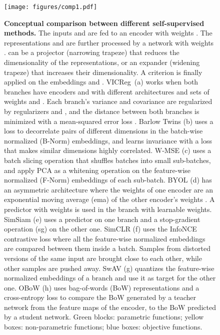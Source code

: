 \documentclass{article}
\newcommand{\algo}{VICReg}
\begin{document}
\newpage

\begin{figure}[t]
\centering
\hspace{2mm}
{\texttt{[image: figures/comp1.pdf]}}
\vspace{-10mm}
\end{figure}

\begin{figure}[t]
\centering
\captionsetup[subfigure]{labelformat=empty}
\vspace{-4mm}
\caption{\textbf{Conceptual comparison between different self-supervised methods.} The inputs  and  are fed to an encoder  with weights . The representations  and  are further processed by a network  with weights .  can be a projector (narrowing trapeze) that reduces the dimensionality of the representations, or an expander (widening trapeze) that increases their dimensionality. A criterion is finally applied on the embeddings  and . \algo \ (a) works when both branches have encoders  and  with different architectures and sets of weights  and . Each branch's variance and covariance are regularized by regularizers  and , and the distance between both branches is minimized with a mean-squared error loss . Barlow Twins (b) uses a loss  to decorrelate pairs of different dimensions in the batch-wise normalized (B-Norm) embeddings, and learns invariance with a loss  that makes similar dimensions highly correlated. W-MSE (c) uses a batch slicing operation that shuffles batches into small sub-batches, and apply PCA as a whitening operation on the feature-wise normalized (F-Norm) embeddings of each sub-batch. BYOL (d) has an asymmetric architecture where the weights  of one encoder are an exponential moving average (ema) of the other encoder's weights . A predictor  with weights  is used in the branch with learnable weights. SimSiam (e) uses a predictor on one branch and a stop-gradient operation (sg) on the other one. SimCLR (f) uses the InfoNCE contrastive loss where all the feature-wise normalized embeddings are compared between them inside a batch. Samples from distorted versions of the same input are brought close to each other, while other samples are pushed away. SwAV (g) quantizes the feature-wise normalized embeddings of a branch and use it as target for the other one. OBoW (h) uses bag-of-words (BoW) representations and a cross-entropy loss to compare the BoW generated by a teacher network from the feature maps  of the encoder, to the BoW predicted by a student network. Green blocks: parametric functions; yellow boxes: non-parametric functions; blue boxes: objective functions.}
\label{fig:vicreg_comp}
\end{figure}
\end{document}
